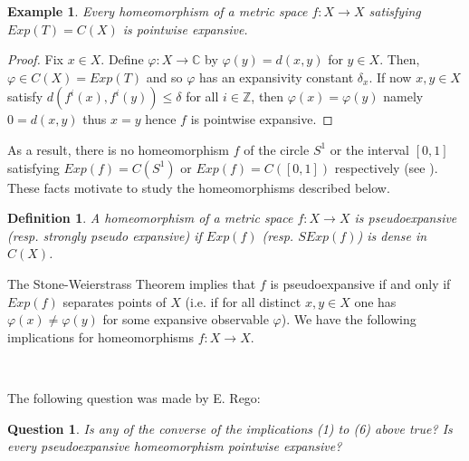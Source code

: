 \documentclass[11pt,letterpaper]{amsart}
\newtheorem{question}{Question}
\newtheorem{definition}{Definition}
\newtheorem{example}{Example}
\begin{document}
\begin{example}
Every homeomorphism of a metric space $f:X\to X$ satisfying $Exp(T)=C(X)$ is pointwise expansive.
\end{example}

\begin{proof}
Fix $x\in X$. Define $\varphi:X\to \mathbb{C}$ by
$\varphi(y)=d(x,y)$ for $y\in X$. Then, $\varphi\in C(X)=Exp(T)$ and so
$\varphi$ has an expansivity constant $\delta_x$.
If now $x,y\in X$ satisfy $d(f^i(x),f^i(y))\leq \delta$ for all $i\in\mathbb{Z}$,
then $\varphi(x)=\varphi(y)$ namely $0=d(x,y)$ thus $x=y$ hence $f$ is pointwise expansive.
\end{proof}

As a result,
there is no homeomorphism $f$ of the circle $S^1$ or the interval $[0,1]$
satisfying $Exp(f)=C(S^1)$ or $Exp(f)=C([0,1])$ respectively (see \cite{r}).
These facts motivate to study the homeomorphisms described below. 

\begin{definition}
A homeomorphism of a metric space $f:X\to X$ is
 {\em pseudoexpansive} (resp. {\em strongly pseudo expansive}) if $Exp(f)$ (resp. $SExp(f)$) is dense in $C(X)$.
 \end{definition}
 
The Stone-Weierstrass Theorem implies that $f$ is pseudoexpansive if and only if $Exp(f)$ separates points of $X$  (i.e. if
for all distinct $x,y\in X$ one has $\varphi(x)\neq\varphi(y)$ for some
expansive observable $\varphi$).
We have the following implications for homeomorphisms $f:X\to X$.\\

\centerline{
\\
}

\medskip

\medskip

The following question was made by E. Rego:

\begin{question}
Is any of the converse of the implications (1) to (6) above true?
Is every pseudoexpansive homeomorphism pointwise expansive? 
\end{question}
\end{document}
